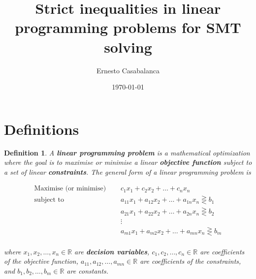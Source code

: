 \documentclass[preview,border=12pt,varwidth]{report}
\title{Strict inequalities in linear programming problems for SMT solving}
\author{Ernesto Casabalanca}
\date{\today}
\newtheorem{definition}{Definition}
\begin{document}
\maketitle

\section*{Definitions}

\begin{definition}
    A \textbf{linear programming problem} is a mathematical optimization where the goal is to maximise or minimise a linear \textbf{objective function} subject to a set of linear \textbf{constraints}. The general form of a linear programming problem is

    \begin{align*}
        \text{Maximise (or minimise) } \quad & c_1x_1 + c_2x_2 + \ldots + c_nx_n                            \\
        \text{subject to }             \quad & a_{11} x_1 + a_{12} x_2 + \ldots + a_{1n} x_n \gtreqless b_1 \\
                                             & a_{21} x_1 + a_{22} x_2 + \ldots + a_{2n} x_n \gtreqless b_2 \\
                                             & \vdots                                                       \\
                                             & a_{m1} x_1 + a_{m2} x_2 + \ldots + a_{mn} x_n \gtreqless b_m \\
    \end{align*}

    where $x_1, x_2, \ldots, x_n \in \mathbb{R}$ are \textbf{decision variables}, $c_1, c_2, \ldots, c_n \in \mathbb{R}$ are coefficients of the objective function, $a_{11}, a_{12}, \ldots, a_{mn} \in \mathbb{R}$ are coefficients of the constraints, and $b_1, b_2, \ldots, b_m \in \mathbb{R}$ are constants.
\end{definition}
\end{document}
